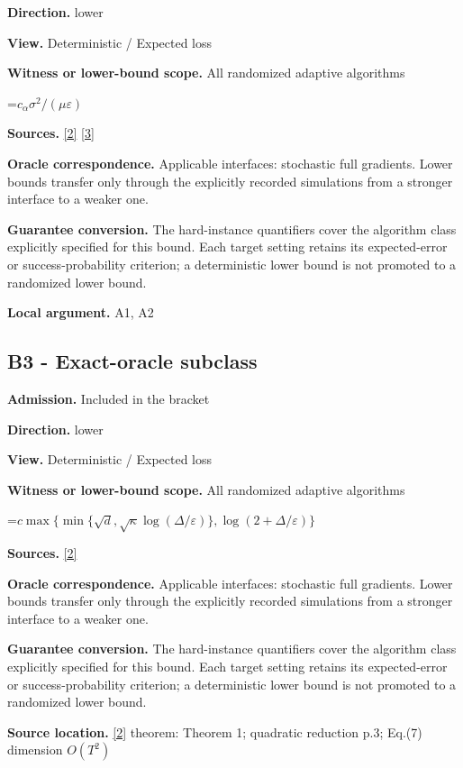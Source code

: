\documentclass[10pt,a4paper]{article}
\newcommand{\AtlasMath}[1]{\par\begingroup\centering\setbox0=\hbox{$\displaystyle #1$}\ifdim\wd0>1.4\linewidth\typeout{ATLAS WIDE FORMULA: \the\wd0}\fi\ifdim\wd0>\linewidth\resizebox{\linewidth}{!}{\box0}\else\box0\fi\par\endgroup}
\begin{document}
\textbf{Direction.} lower

\textbf{View.} Deterministic / Expected loss

\textbf{Witness or lower-bound scope.} All randomized adaptive algorithms

\AtlasMath{c_\alpha \sigma^2/(\mu\varepsilon)}
\textbf{Sources.} \href{https://arxiv.org/pdf/2609.10874}{[2]} \href{https://proceedings.mlr.press/v202/sadiev23a/sadiev23a.pdf}{[3]}

\textbf{Oracle correspondence.} Applicable interfaces: stochastic full gradients. Lower bounds transfer only through the explicitly recorded simulations from a stronger interface to a weaker one.

\textbf{Guarantee conversion.} The hard-instance quantifiers cover the algorithm class explicitly specified for this bound. Each target setting retains its expected-error or success-probability criterion; a deterministic lower bound is not promoted to a randomized lower bound.

\textbf{Local argument.} A1, A2

\subsection{B3 - Exact-oracle subclass}
\textbf{Admission.} Included in the bracket

\textbf{Direction.} lower

\textbf{View.} Deterministic / Expected loss

\textbf{Witness or lower-bound scope.} All randomized adaptive algorithms

\AtlasMath{c\max\{\min\{\sqrt d,\sqrt\kappa\log(\Delta/\varepsilon)\},\log(2+\Delta/\varepsilon)\}}
\textbf{Sources.} \href{https://arxiv.org/pdf/2609.10874}{[2]}

\textbf{Oracle correspondence.} Applicable interfaces: stochastic full gradients. Lower bounds transfer only through the explicitly recorded simulations from a stronger interface to a weaker one.

\textbf{Guarantee conversion.} The hard-instance quantifiers cover the algorithm class explicitly specified for this bound. Each target setting retains its expected-error or success-probability criterion; a deterministic lower bound is not promoted to a randomized lower bound.

\textbf{Source location.} \href{https://arxiv.org/pdf/2609.10874}{[2]} theorem: Theorem 1; quadratic reduction p.3; Eq.(7) dimension $O(T^2)$
\end{document}
